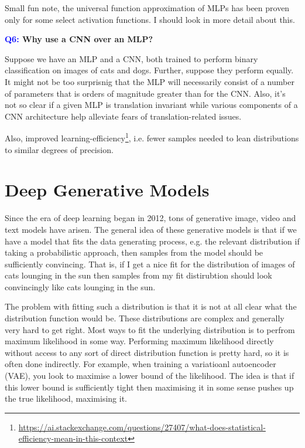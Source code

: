 \documentclass[11pt]{article}
\begin{document}
Small fun note, the universal function approximation of MLPs has been proven only for some select activation functions. I should look in more detail about this.

\begin{center}
    \textbf{\textcolor{blue}{Q6:} Why use a CNN over an MLP?}
\end{center}
Suppose we have an MLP and a CNN, both trained to perform binary classification on images of cats and dogs. Further, suppose they perform equally. It might not be too surprisnig that the MLP will necessarily consist of a number of parameters that is orders of magnitude greater than for the CNN. Also, it's not so clear if a given MLP is translation invariant while various components of a CNN architecture help alleviate fears of translation-related issues.

Also, improved learning-efficiency\footnote{\url{https://ai.stackexchange.com/questions/27407/what-does-statistical-efficiency-mean-in-this-context}}, i.e. fewer samples needed to lean distributions to similar degrees of precision.

\section{Deep Generative Models}

Since the era of deep learning began in 2012, tons of generative image, video and text models have arisen. The general idea of these generative models is that if we have a model that fits the data generating process, e.g. the relevant distribution if taking a probabilistic approach, then samples from the model should be sufficiently convincing. That is, if I get a nice fit for the distribution of images of cats lounging in the sun then samples from my fit distirubtion should look convincingly like cats lounging in the sun.

The problem with fitting such a distribution is that it is not at all clear what the distribution function would be. These distributions are complex and generally very hard to get right. Most ways to fit the underlying distribution is to perfrom maximum likelihood in some way. Performing maximum likelihood directly without access to any sort of direct distribution function is pretty hard, so it is often done indirectly. For example, when training a variatioanl autoencoder (VAE), you look to maximise a lower bound of the likelihood. The idea is that if this lower bound is sufficiently tight then maximising it in some sense pushes up the true likelihood, maximising it.
\end{document}
